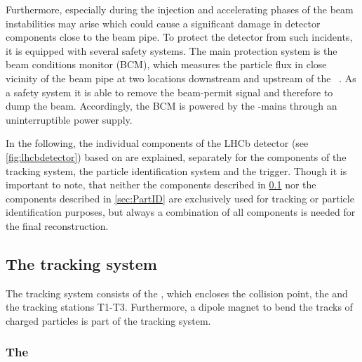 Furthermore, especially during the injection and accelerating phases of the \lhc beam instabilities may arise which could cause a significant damage in detector components close to the beam pipe.
To protect the detector from such incidents, it is equipped with several safety systems.
The main protection system is the beam conditions monitor (BCM), which measures the particle flux in close vicinity of the beam pipe at two locations downstream and upstream of the \velo~\cite{Ilgner:2010vu}.
As a safety system it is able to remove the beam-permit signal and therefore to dump the \lhc beam.
Accordingly, the BCM is powered by the \lhc-mains through an uninterruptible power supply.

In the following, the individual components of the LHCb detector (see \cref{fig:lhcbdetector}) based on \cite{Alves:2008zz} are explained, separately for the components of the tracking system, the particle identification system and the \lhcb trigger. Though it is important to note, that neither the components described in \cref{sec:tracking} nor the components described in \cref{sec:PartID} are exclusively used for tracking or particle identification purposes, but always a combination of all components is needed for the final reconstruction.

\subsection{The tracking system}
\label{sec:tracking}

The tracking system consists of the \velo, which encloses the collision point, the \ttracker and the tracking stations T1-T3.
Furthermore, a dipole magnet to bend the tracks of charged particles is part of the tracking system.

\subsubsection*{The \velo}
\label{sec:velo}

